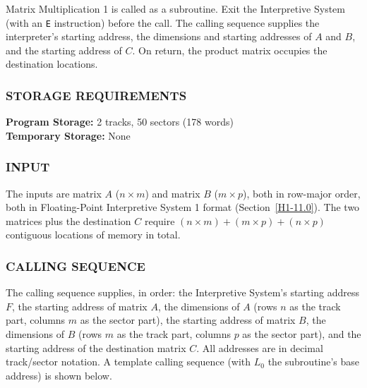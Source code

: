 Matrix Multiplication 1 is called as a subroutine. Exit the Interpretive System (with an \texttt{E} instruction) before the call. The calling sequence supplies the interpreter's starting address, the dimensions and starting addresses of $A$ and $B$, and the starting address of $C$. On return, the product matrix occupies the destination locations.

\subsubsection*{STORAGE REQUIREMENTS}
\textbf{Program Storage:} 2 tracks, 50 sectors (178 words) \\
\textbf{Temporary Storage:} None

\subsubsection*{INPUT}
The inputs are matrix $A$ ($n \times m$) and matrix $B$ ($m \times p$), both in row-major order, both in Floating-Point Interpretive System 1 format (Section~\ref{H1-11.0}). The two matrices plus the destination $C$ require $(n \times m) + (m \times p) + (n \times p)$ contiguous locations of memory in total.

\subsubsection*{CALLING SEQUENCE}
The calling sequence supplies, in order: the Interpretive System's starting address $F$, the starting address of matrix $A$, the dimensions of $A$ (rows $n$ as the track part, columns $m$ as the sector part), the starting address of matrix $B$, the dimensions of $B$ (rows $m$ as the track part, columns $p$ as the sector part), and the starting address of the destination matrix $C$. All addresses are in decimal track/sector notation. A template calling sequence (with \texttt{$L_0$} the subroutine's base address) is shown below.

